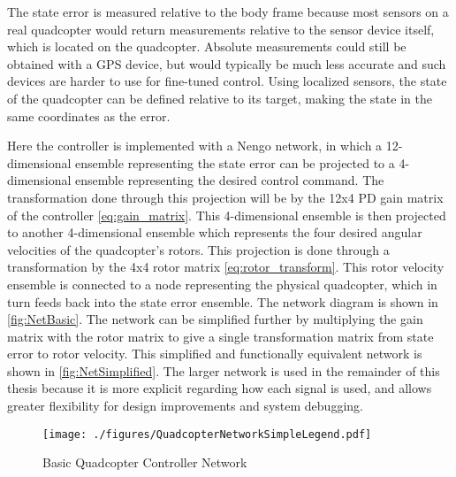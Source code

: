 \documentclass[letterpaper,12pt,titlepage,oneside,final]{book}
\begin{document}

The state error is measured relative to the body frame because most sensors on a real quadcopter would return measurements relative to the sensor device itself, which is located on the quadcopter. Absolute measurements could still be obtained with a GPS device, but would typically be much less accurate and such devices are harder to use for fine-tuned control. Using localized sensors, the state of the quadcopter can be defined relative to its target, making the state in the same coordinates as the error.

Here the controller is implemented with a Nengo network, in which a 12-dimensional ensemble representing the state error can be projected to a 4-dimensional ensemble representing the desired control command. 
The transformation done through this projection will be by the 12x4 PD gain matrix of the controller \eqref{eq:gain_matrix}. 
This 4-dimensional ensemble is then projected to another 4-dimensional ensemble which represents the four desired angular velocities of the quadcopter's rotors. 
This projection is done through a transformation by the 4x4 rotor matrix \eqref{eq:rotor_transform}. 
This rotor velocity ensemble is connected to a node representing the physical quadcopter, which in turn feeds back into the state error ensemble. 
The network diagram is shown in \autoref{fig:NetBasic}. 
The network can be simplified further by multiplying the gain matrix with the rotor matrix to give a single transformation matrix from state error to rotor velocity. 
This simplified and functionally equivalent network is shown in \autoref{fig:NetSimplified}.
The larger network is used in the remainder of this thesis because it is more explicit regarding how each signal is used, and allows greater flexibility for design improvements and system debugging.

\begin{figure}
\centering
\texttt{[image: ./figures/QuadcopterNetworkSimpleLegend.pdf]} %
\caption{Basic Quadcopter Controller Network}
\label{fig:NetBasic}
\captionsetup{singlelinecheck=off,font=footnotesize}
\caption*{
}
\end{figure}
\end{document}
